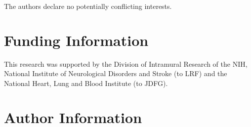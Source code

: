 \documentclass[9pt,tutorial]{livecoms}
\begin{document}
The authors declare no potentially conflicting interests.

\section{Funding Information}
This research was supported by the Division of Intramural Research of the NIH, National Institute of Neurological Disorders and Stroke (to LRF) and the National Heart, Lung and Blood Institute (to JDFG).

\section*{Author Information}
\makeorcid




\end{document}
